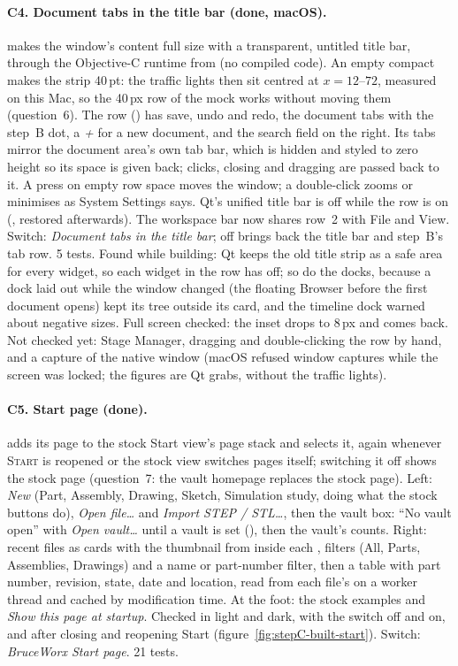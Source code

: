 \paragraph{C4. Document tabs in the title bar (done, macOS).}  makes the window's
content full size with a transparent, untitled title bar, through the Objective-C runtime from  (no
compiled code). An empty compact  makes the strip 40\,pt: the traffic lights then sit centred at
$x = 12$--$72$, measured on this Mac, so the 40\,px row of the mock works without moving them (question~6). The
row () has save, undo and redo, the document tabs with the step~B dot, a \emph{+} for a
new document, and the search field on the right. Its tabs mirror the document area's own tab bar, which is hidden
and styled to zero height so its space is given back; clicks, closing and dragging are passed back to it. A press
on empty row space moves the window; a double-click zooms or minimises as System Settings says. Qt's unified
title bar is off while the row is on (, restored afterwards). The
workspace bar now shares row~2 with File and View. Switch: \emph{Document tabs in the title bar}; off brings back
the title bar and step~B's tab row. 5 tests. Found while building: Qt keeps the old title strip as a safe area for every
widget, so each widget in the row has  off; so do the docks, because a
dock laid out while the window changed (the floating Browser before the first document opens) kept its tree
outside its card, and the timeline dock warned about negative sizes. Full screen checked: the
inset drops to 8\,px and comes back. Not checked yet: Stage Manager, dragging and double-clicking the row by
hand, and a capture of the native window (macOS refused window captures while the screen was
locked; the figures are Qt grabs, without the traffic lights).

\paragraph{C5. Start page (done).}  adds its page to the stock Start view's page
stack and selects it, again whenever \textsc{Start} is reopened or the stock view switches pages itself; switching
it off shows the stock page (question~7: the vault homepage replaces the stock page). Left: \emph{New} (Part,
Assembly, Drawing, Sketch, Simulation study, doing what the stock buttons do), \emph{Open file\ldots} and
\emph{Import STEP / STL\ldots}, then the vault box: ``No vault open'' with \emph{Open vault\ldots} until a vault is
set (), then the vault's counts. Right: recent files as cards with the thumbnail from
inside each , filters (All, Parts, Assemblies, Drawings) and a name or part-number filter, then a table
with part number, revision, state, date and location, read from each file's  on a worker
thread and cached by modification time. At the foot: the stock examples and \emph{Show this page at startup}.
Checked in light and dark, with the switch off and on, and after closing and reopening Start
(figure~\ref{fig:stepC-built-start}). Switch: \emph{BruceWorx Start page}. 21 tests.

